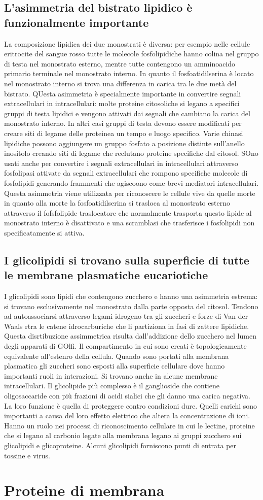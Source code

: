 \subsection{L'asimmetria del bistrato lipidico \`e funzionalmente importante}
La composizione lipidica dei due monostrati \`e diversa: per esempio nelle cellule eritrocite del sangue rosso tutte le molecole fosfolipidiche hanno colina nel gruppo di testa nel 
monostrato esterno, mentre tutte contengono un amminoacido primario terminale nel monostrato interno. In quanto il fosfoatidilserina \`e locato nel monostrato interno si trova una
differenza in carica tra le due met\`a del bistrato. QUesta asimmetria \`e specialmente importante in convertire segnali extracellulari in intracellulari: molte proteine citosoliche
si legano a specifici gruppi di testa lipidici e vengono attivati dai segnali che cambiano la carica del monostrato interno. In altri casi gruppi di testa devono essere modificati per 
creare siti di legame delle proteinea un tempo e luogo specifico. Varie chinasi lipidiche possono aggiungere un gruppo fosfato a posizione distinte sull'anello inositolo creando siti
di legame che reclutano proteine specifiche dal citosol. SOno usati anche per convertire i segnali extracellulari in intracellulari attraverso fosfolipasi attivate da segnali 
extracellulari che rompono specifiche molecole di fosfolipidi generando frammenti che agiscoono come brevi mediatori intracellulari. Questa asimmetria viene utilizzata per riconoscere
le cellule vive da quelle morte in quanto alla morte la fosfoatidilserina si trasloca al monostrato esterno attraverso il fofsfolipide traslocatore che normalmente trasporta questo
lipide al monostrato interno \`e disattivato e una scramblasi che trasferisce i fosfolipidi non specificatamente si attiva.
\subsection{I glicolipidi si trovano sulla superficie di tutte le membrane plasmatiche eucariotiche}
I glicolipidi sono lipidi che contengono zucchero e hanno una asimmetria estrema: si trovano esclusivamente nel monostrato dalla parte opposta del citosol. Tendono ad autoassociarsi
attraverso legami idrogeno tra gli zuccheri e forze di Van der Waals rtra le catene idrocarburiche che li partiziona in fasi di zattere lipidiche. Questa disrtibuzione assimmetrica
risulta dall'addizione dello zucchero nel lumen degli apparati di GOlfi. Il compartimento in cui sono creati \`e topologicamente equivalente all'estenro della cellula. Quando sono 
portati alla membrana plasmatica gli zuccheri sono esposti alla superficie cellulare dove hanno importanti ruoli in interazioni. Si trovano anche in alcune membrane intracellulari. Il
glicolipide pi\`u complesso \`e il ganglioside che contiene oligosaccaride con pi\`u frazioni di acidi sialici che gli danno una carica negativa. La loro funzione \`e quella di 
proteggere contro condizioni dure. Quelli carichi sono importanti a causa del loro effetto elettrico che altera la concentrazione di ioni. Hanno un ruolo nei processi di riconoscimento
cellulare in cui le lectine, proteine che si legano al carbonio legate alla membrana legano ai gruppi zucchero sui glicolipidi e glicoproteine. Alcuni glicolipidi forniscono punti di 
entrata per tossine e virus.
\section{Proteine di membrana}
